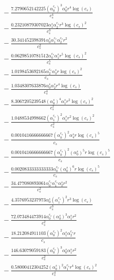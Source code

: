 \documentclass[10pt]{article}
\begin{document}
\begin{align*}
&{}  - \frac{7.2790652142225 \left(\alpha_{0}^{c_s}\right)^{3} \alpha_{0}^s r^{4} \log{\left(c_{s} \right)}}{c_{s}^{4}} \\
&{}  - \frac{0.23210879307023 \alpha_{1}^s \alpha_{2}^{c_s} r^{3} \log{\left(c_{s} \right)}^{2}}{c_{s}^{3}} \\
&{}  - \frac{30.341452398391 \alpha_{0}^s \alpha_{1}^{c_s} \alpha_{2}^{c_s} r^{2}}{c_{s}^{2}} \\
&{}  - \frac{0.06298510781512 \alpha_{0}^{c_s} \alpha_{1}^s r^{5} \log{\left(c_{s} \right)}^{2}}{c_{s}^{5}} \\
&{}  - \frac{1.0198453692165 \alpha_{2}^{c_s} \alpha_{3}^s r \log{\left(c_{s} \right)}^{2}}{c_{s}} \\
&{}  - \frac{1.0348307633876 \alpha_{0}^s \alpha_{2}^s r^{4} \log{\left(c_{s} \right)}}{c_{s}^{4}} \\
&{}  - \frac{8.3067205239548 \left(\alpha_{0}^s\right)^{4} \alpha_{1}^s r^{2} \log{\left(c_{s} \right)}^{2}}{c_{s}^{2}} \\
&{}  - \frac{1.0488534998662 \left(\alpha_{1}^{c_s}\right)^{2} \alpha_{1}^s r^{2} \log{\left(c_{s} \right)}^{2}}{c_{s}^{2}} \\
&{}  - \frac{0.0010416666666667 \left(\alpha_{0}^{c_s}\right)^{2} \alpha_{4}^s r \log{\left(c_{s} \right)}^{5}}{c_{s}} \\
&{}  - \frac{0.0010416666666667 \left(\alpha_{0}^{c_s}\right)^{2} \left(\alpha_{0}^s\right)^{5} r \log{\left(c_{s} \right)}^{5}}{c_{s}} \\
&{}  - \frac{0.0020833333333333 \alpha_{0}^{c_s} \left(\alpha_{0}^s\right)^{6} r \log{\left(c_{s} \right)}^{5}}{c_{s}} \\
&{}  - \frac{34.477080893061 \alpha_{0}^{c_s} \alpha_{1}^{c_s} \alpha_{2}^s r^{2}}{c_{s}^{2}} \\
&{}  - \frac{4.3576953237973 \alpha_{0}^s \left(\alpha_{1}^{c_s}\right)^{2} r^{3} \log{\left(c_{s} \right)}}{c_{s}^{3}} \\
&{}  - \frac{72.073484473914 \alpha_{0}^{c_s} \left(\alpha_{0}^s\right)^{3} \alpha_{1}^s r^{2}}{c_{s}^{2}} \\
&{}  - \frac{18.212084911103 \left(\alpha_{0}^{c_s}\right)^{2} \alpha_{1}^s \alpha_{2}^{c_s} r}{c_{s}} \\
&{}  - \frac{146.63079059183 \left(\alpha_{0}^{c_s}\right)^{3} \alpha_{0}^s \alpha_{1}^s r^{2}}{c_{s}^{2}} \\
&{}  - \frac{0.58000412304252 \left(\alpha_{0}^s\right)^{2} \alpha_{1}^{c_s} r^{4} \log{\left(c_{s} \right)}^{2}}{c_{s}^{4}} \\

\end{align*}
\end{document}
